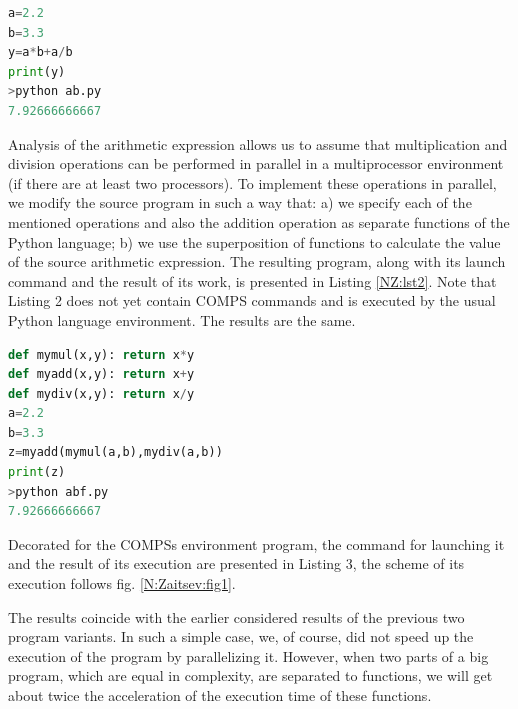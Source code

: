 \documentclass[10pt, a5paper]{article}
\begin{document}
\renewcommand{\lstlistingname}{Listing}

\begin{lstlisting}[language=Python,caption={~},label={NZ:lst1}]
a=2.2
b=3.3
y=a*b+a/b
print(y)
>python ab.py
7.92666666667
\end{lstlisting}
Analysis of the arithmetic expression allows us to assume that multipli\-cation and division operations can be performed in parallel in a multi\-processor environment (if there are at least two processors). To imple\-ment these operations in parallel, we modify the source program in such a way that: a) we specify each of the mentioned operations and also the addition operation as separate functions of the Python language; b) we use the superposition of functions to calculate the value of the source arithmetic expression. The resulting program, along with its launch command and the result of its work, is presented in Listing \ref{NZ:lst2}. Note that Listing 2 does not yet contain COMPS commands and is executed by the usual Python language environment. The results are the same.


\begin{lstlisting}[language=Python,caption={~},label={NZ:lst2}]
def mymul(x,y): return x*y
def myadd(x,y): return x+y
def mydiv(x,y): return x/y
a=2.2
b=3.3
z=myadd(mymul(a,b),mydiv(a,b))
print(z)
>python abf.py
7.92666666667\end{lstlisting}

Decorated for the COMPSs environment program, the command for launching it and the result of its execution are presented in Listing 3, the scheme of its execution follows fig. \ref{N:Zaitsev:fig1}.

The results coincide with the earlier considered results of the \linebreak previous two program variants. In such a simple case, we, of course, did not speed up the execution of the program by parallelizing it. However, when two parts of a big program, which are equal in complexity, are separated to functions, we will get about twice the acceleration of the execution time of these functions.
\end{document}
